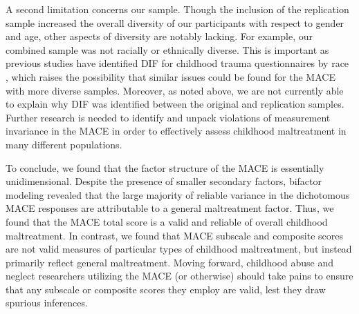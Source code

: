 \documentclass[letterpaper,man,natbib]{apa6}  %
\begin{document}
A second limitation concerns our sample. Though the inclusion of the replication sample increased the overall diversity of our participants with respect to gender and age, other aspects of diversity are notably lacking. For example, our combined sample was not racially or ethnically diverse. This is important as previous studies have identified DIF for childhood trauma questionnaires by race \citep{thombs2007evaluation, rodriguez2019identification}, which raises the possibility that similar issues could be found for the MACE with more diverse samples. Moreover, as noted above, we are not currently able to explain why DIF was identified between the original and replication samples. Further research is needed to identify and unpack violations of measurement invariance in the MACE in order to effectively assess childhood maltreatment in many different populations. 

To conclude, we found that the factor structure of the MACE is essentially unidimensional. Despite the presence of smaller secondary factors, bifactor modeling revealed that the large majority of reliable variance in the dichotomous MACE responses are attributable to a general maltreatment factor. Thus, we found that the MACE total score is a valid and reliable of overall childhood maltreatment. In contrast, we found that MACE subscale and composite scores are not valid measures of particular types of childhood maltreatment, but instead primarily reflect general maltreatment. Moving forward, childhood abuse and neglect researchers utilizing the MACE (or otherwise) should take pains to ensure that any subscale or composite scores they employ are valid, lest they draw spurious inferences.  


\end{document}
